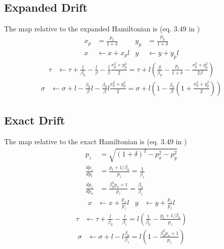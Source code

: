 \documentclass[english]{article}
\begin{document}
\subsection{Expanded Drift}

The map relative to the expanded Hamiltonian is (eq. 3.49 in \cite{ripken95})
\begin{align}
  x_p &= \frac{p_x}{1+\delta} & 
  y_p &= \frac{p_y}{1+\delta}  \\
  x & \leftarrow x + x_p l &
  y & \leftarrow y + y_p l
\end{align}
\begin{align}
  \tau & \leftarrow \tau +
   \frac{l}{\beta_0} - \frac{l}{\beta} -
    \frac{l}{\beta} \frac{x_p^2+y_p^2}{2}=
    \tau+
    l\left(\frac{\delta}{\beta_0}-\frac{p_t}{1+\delta} - \frac{x_p^2+y_p^2}{2\beta}\right)
\end{align}
\begin{align}
  \sigma & \leftarrow \sigma +
   l - \frac{\beta_0}{\beta} l -
    \frac{\beta_0}{\beta} l \frac{x_p^2+y_p^2}{2}=
    \sigma+
    l\left(1- \frac{\beta_0}{\beta}\left(1 + \frac{x_p^2+y_p^2}{2}\right)\right)
\end{align}

\subsection{Exact Drift}

The map relative to the exact Hamiltonian is (eq. 3.49 in \cite{ripken95})
\begin{align}
  p_z&=\sqrt{(1+\delta)^2 - p_x^2 - p_y^2} \\
  \frac{d p_z}{d p_t}&= \frac{p_t+1/\beta_0}{p_z} = \frac{1}{\beta_z}  \\
  \frac{d p_z}{d p_\sigma}&= \frac{\beta_0^2 p_\sigma+1}{p_z} = \frac{\beta_0}{\beta_z}  
\end{align}
\begin{align}
  x & \leftarrow x + \frac{p_x}{p_z} l  &
  y & \leftarrow y + \frac{p_x}{p_z} l
\end{align}
\begin{align}
  \tau & \leftarrow \tau + \frac{l}{\beta_0}
  -\frac{l}{\beta_z}=
  l\left(\frac{1}{\beta_0}-\frac{p_t+1/\beta_0}{p_z}\right)
\end{align}
\begin{align}
  \sigma & \leftarrow \sigma + l
  -l \frac{\beta_0}{\beta_z}=
  l\left(1-\frac{\beta_0^2 p_\sigma+1}{p_z}\right)
\end{align}
\end{document}
